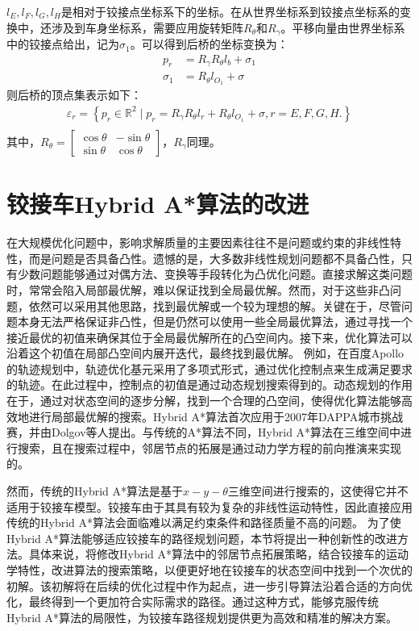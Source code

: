 \documentclass[master,academic]{ysuthesis} %
\begin{document}
	$l_E,l_F,l_G,l_H$是相对于铰接点坐标系下的坐标。在从世界坐标系到铰接点坐标系的变换中，还涉及到车身坐标系，需要应用旋转矩阵$R_\theta$和$R_\gamma$。平移向量由世界坐标系中的铰接点给出，记为$\sigma_1$。可以得到后桥的坐标变换为： 
	\begin{equation}
		\begin{aligned}
				p_r&=R_\gamma R_\theta l_b+\sigma_1\\
				\sigma_1&=R_\theta l_{O_1}+\sigma
		\end{aligned}
	\end{equation}
	则后桥的顶点集表示如下：
	\begin{equation}
		\begin{aligned}
			\varepsilon_r = \left\{ p_r \in \mathbb{R}^2 \mid p_r=R_\gamma R_\theta l_r+R_\theta l_{O_1}+\sigma,r = E,F,G,H.  \right\} \\
		\end{aligned}
	\end{equation}
	其中，$R_\theta = \begin{bmatrix}
		\cos\theta &-\sin\theta\\
		\sin\theta &\cos\theta
	\end{bmatrix}$，$R_\gamma$同理。

	
	\section{铰接车Hybrid A*算法的改进}
	在大规模优化问题中，影响求解质量的主要因素往往不是问题或约束的非线性特性，而是问题是否具备凸性。遗憾的是，大多数非线性规划问题都不具备凸性，只有少数问题能够通过对偶方法、变换等手段转化为凸优化问题。直接求解这类问题时，常常会陷入局部最优解，难以保证找到全局最优解。然而，对于这些非凸问题，依然可以采用其他思路，找到最优解或一个较为理想的解。关键在于，尽管问题本身无法严格保证非凸性，但是仍然可以使用一些全局最优算法，通过寻找一个接近最优的初值来确保其位于全局最优解所在的凸空间内。接下来，优化算法可以沿着这个初值在局部凸空间内展开迭代，最终找到最优解。
	例如，在百度Apollo的轨迹规划中，轨迹优化基元采用了多项式形式，通过优化控制点来生成满足要求的轨迹。在此过程中，控制点的初值是通过动态规划搜索得到的。动态规划的作用在于，通过对状态空间的逐步分解，找到一个合理的凸空间，使得优化算法能够高效地进行局部最优解的搜索。Hybrid A*算法首次应用于2007年DAPPA城市挑战赛，并由Dolgov等人提出。与传统的A*算法不同，Hybrid A*算法在三维空间中进行搜索，且在搜索过程中，邻居节点的拓展是通过动力学方程的前向推演来实现的。
	
	然而，传统的Hybrid A*算法是基于$x-y-\theta$三维空间进行搜索的，这使得它并不适用于铰接车模型。铰接车由于其具有较为复杂的非线性运动特性，因此直接应用传统的Hybrid A*算法会面临难以满足约束条件和路径质量不高的问题。
	为了使Hybrid A*算法能够适应铰接车的路径规划问题，本节将提出一种创新性的改进方法。具体来说，将修改Hybrid A*算法中的邻居节点拓展策略，结合铰接车的运动学特性，改进算法的搜索策略，以便更好地在铰接车的状态空间中找到一个次优的初解。该初解将在后续的优化过程中作为起点，进一步引导算法沿着合适的方向优化，最终得到一个更加符合实际需求的路径。通过这种方式，能够克服传统Hybrid A*算法的局限性，为铰接车路径规划提供更为高效和精准的解决方案。
\end{document}
